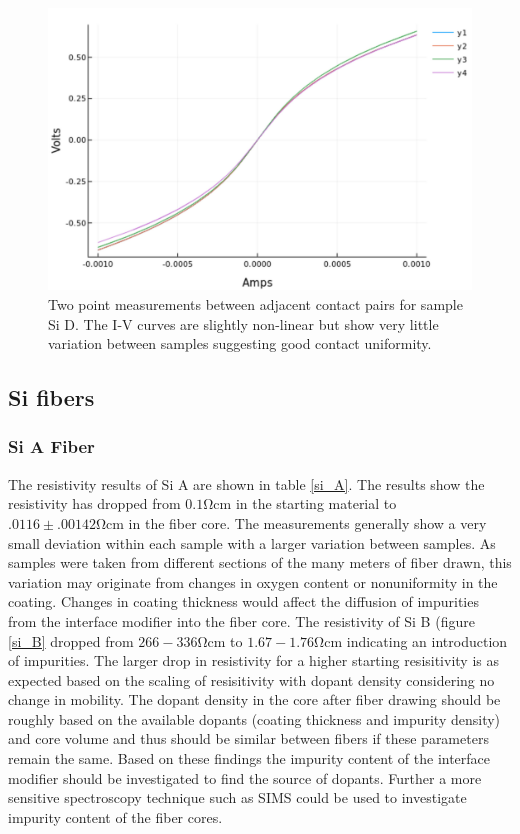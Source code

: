 \begin{figure}
    \centering
    \includegraphics[width=.6\textwidth]{fig/Results/2pnt_compareMb25.jpg}
    \caption{Two point measurements between adjacent contact pairs for sample Si D. The I-V curves are slightly non-linear but show very little variation between samples suggesting good contact uniformity. }
    \label{fig:mb25 2pnt}
\end{figure}
\FloatBarrier

\subsection{Si fibers}
\subsubsection{Si A Fiber}
The resistivity results of Si A are shown in table \ref{si_A}.  The results show the resistivity has dropped from $0.1 \si{\ohm\cm}$ in the starting material to  $.0116 \pm .00142 \si{\ohm\cm}$ in the fiber core. The measurements generally show a very small deviation within each sample with a larger variation between samples. As samples were taken from different sections of the many meters of fiber drawn, this variation may originate from changes in oxygen content or nonuniformity in the coating. Changes in coating thickness would affect the diffusion of impurities from the interface modifier into the fiber core.  The resistivity of Si B (figure \ref{si_B} dropped from $266-336 \si{\ohm\cm}$ to $1.67-1.76 \si{\ohm\cm}$ indicating an introduction of impurities. The larger drop in resistivity for a higher starting resisitivity is as expected based on the scaling of resisitivity with dopant density considering no change in mobility. The dopant density in the core after fiber drawing should be roughly based on the available dopants (coating thickness and impurity density) and core volume and thus should be similar between fibers if these parameters remain the same. 
Based on these findings the impurity content of the interface modifier should be investigated to find the source of dopants. Further a more sensitive spectroscopy technique such as SIMS could be used to investigate impurity content of the fiber cores. 

